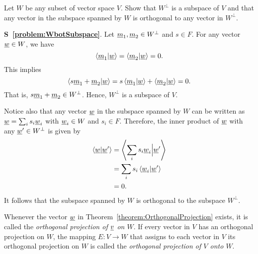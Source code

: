 \begin{problem} \label{problem:WbotSubspace}
Let $W$ be any subset of vector space $V$.
Show that $W^{\bot}$ is a subspace of $V$ and that any vector in the subspace spanned by $W$ is orthogonal to any vector in $W^{\bot}$.
\end{problem}
\noindent
\textbf{S~\ref{problem:WbotSubspace}}.
Let $\underline{m}_1, \underline{m}_2 \in W^{\bot}$ and $s \in F$.
For any vector $\underline{w} \in W$, we have
\begin{equation*}
\left\langle \underline{m}_1 | \underline{w} \right\rangle
= \left\langle \underline{m}_2 | \underline{w} \right\rangle
= 0.
\end{equation*}
This implies
\begin{equation*}
\left\langle s \underline{m}_1 + \underline{m}_2 | \underline{w} \right\rangle
= s \left\langle \underline{m}_1 | \underline{w} \right\rangle
+ \left\langle \underline{m}_2 | \underline{w} \right\rangle
= 0.
\end{equation*}
That is, $s \underline{m}_1 + \underline{m}_2 \in W^{\bot}$.
Hence, $W^{\bot}$ is a subspace of $V$.

Notice also that any vector $\underline{w}$ in the subspace spanned by $W$ can be written as $\underline{w} = \sum_{i} s_i \underline{w}_i$ with $\underline{w}_i \in W$ and $s_i \in F$.
Therefore, the inner product of $\underline{w}$ with any $\underline{w}' \in W^{\bot}$ is given by
\begin{align*}
\left\langle \underline{w} | \underline{w}' \right\rangle
&= \left\langle \sum_{i} s_i \underline{w}_i \Big| \underline{w}' \right\rangle \\
&= \sum_{i} s_i \left\langle \underline{w}_i | \underline{w}' \right\rangle \\
&= 0.
\end{align*}
It follows that the subspace spanned by $W$ is orthogonal to the subspace $W^{\bot}$.

\begin{definition}
Whenever the vector $\underline{w}$ in Theorem~\ref{theorem:OrthogonalProjection} exists, it is called the \emph{orthogonal projection of $\underline{v}$ on $W$}.
If every vector in $V$ has an orthogonal projection on $W$, the mapping $E: V \rightarrow W$ that assigns to each vector in $V$ its orthogonal projection on $W$ is called the \emph{orthogonal projection of $V$ onto $W$}.
\end{definition}


